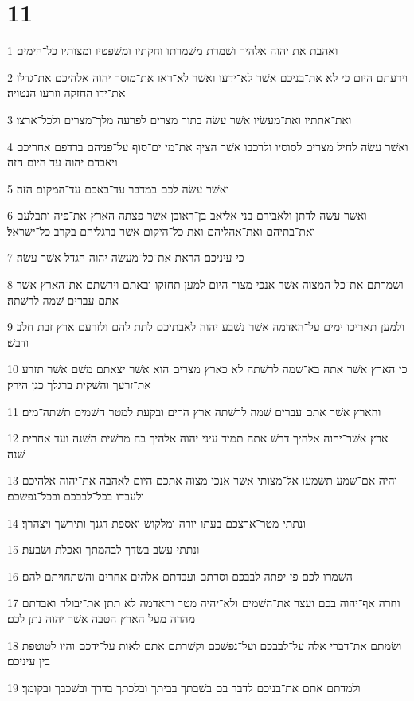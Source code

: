 \chapter{11}

\par 1 ואהבת את יהוה אלהיך ושׁמרת משׁמרתו וחקתיו ומשׁפטיו ומצותיו כל־הימים׃
\par 2 וידעתם היום כי לא את־בניכם אשׁר לא־ידעו ואשׁר לא־ראו את־מוסר יהוה אלהיכם את־גדלו את־ידו החזקה וזרעו הנטויה׃
\par 3 ואת־אתתיו ואת־מעשׂיו אשׁר עשׂה בתוך מצרים לפרעה מלך־מצרים ולכל־ארצו׃
\par 4 ואשׁר עשׂה לחיל מצרים לסוסיו ולרכבו אשׁר הציף את־מי ים־סוף על־פניהם ברדפם אחריכם ויאבדם יהוה עד היום הזה׃
\par 5 ואשׁר עשׂה לכם במדבר עד־באכם עד־המקום הזה׃
\par 6 ואשׁר עשׂה לדתן ולאבירם בני אליאב בן־ראובן אשׁר פצתה הארץ את־פיה ותבלעם ואת־בתיהם ואת־אהליהם ואת כל־היקום אשׁר ברגליהם בקרב כל־ישׂראל׃
\par 7 כי עיניכם הראת את־כל־מעשׂה יהוה הגדל אשׁר עשׂה׃
\par 8 ושׁמרתם את־כל־המצוה אשׁר אנכי מצוך היום למען תחזקו ובאתם וירשׁתם את־הארץ אשׁר אתם עברים שׁמה לרשׁתה׃
\par 9 ולמען תאריכו ימים על־האדמה אשׁר נשׁבע יהוה לאבתיכם לתת להם ולזרעם ארץ זבת חלב ודבשׁ׃
\par 10 כי הארץ אשׁר אתה בא־שׁמה לרשׁתה לא כארץ מצרים הוא אשׁר יצאתם משׁם אשׁר תזרע את־זרעך והשׁקית ברגלך כגן הירק׃
\par 11 והארץ אשׁר אתם עברים שׁמה לרשׁתה ארץ הרים ובקעת למטר השׁמים תשׁתה־מים׃
\par 12 ארץ אשׁר־יהוה אלהיך דרשׁ אתה תמיד עיני יהוה אלהיך בה מרשׁית השׁנה ועד אחרית שׁנה׃
\par 13 והיה אם־שׁמע תשׁמעו אל־מצותי אשׁר אנכי מצוה אתכם היום לאהבה את־יהוה אלהיכם ולעבדו בכל־לבבכם ובכל־נפשׁכם׃
\par 14 ונתתי מטר־ארצכם בעתו יורה ומלקושׁ ואספת דגנך ותירשׁך ויצהרך׃
\par 15 ונתתי עשׂב בשׂדך לבהמתך ואכלת ושׂבעת׃
\par 16 השׁמרו לכם פן יפתה לבבכם וסרתם ועבדתם אלהים אחרים והשׁתחויתם להם׃
\par 17 וחרה אף־יהוה בכם ועצר את־השׁמים ולא־יהיה מטר והאדמה לא תתן את־יבולה ואבדתם מהרה מעל הארץ הטבה אשׁר יהוה נתן לכם׃
\par 18 ושׂמתם את־דברי אלה על־לבבכם ועל־נפשׁכם וקשׁרתם אתם לאות על־ידכם והיו לטוטפת בין עיניכם׃
\par 19 ולמדתם אתם את־בניכם לדבר בם בשׁבתך בביתך ובלכתך בדרך ובשׁכבך ובקומך׃
